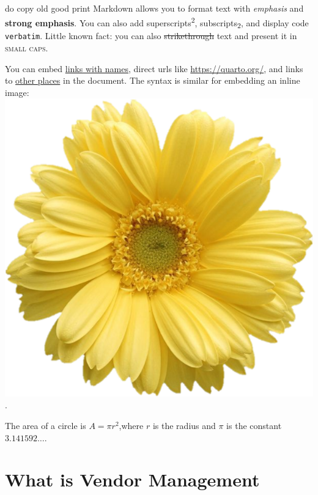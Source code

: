 \documentclass[
  10pt,
  ignorenonframetext,
  aspectratio=43,
]{beamer}
\begin{document}
\begin{frame}[fragile]{do copy old good print}
Markdown allows you to format text with \emph{emphasis} and
\textbf{strong emphasis}. You can also add
superscripts\textsuperscript{2}, subscripts\textsubscript{2}, and
display code \texttt{verbatim}. Little known fact: you can also
\sout{strikethrough} text and present it in \textsc{small caps}.

You can embed \href{https://quarto.org/}{links with names}, direct urls
like \url{https://quarto.org/}, and links to
\protect\hyperlink{inline-elements-text-formatting}{other places} in the
document. The syntax is similar for embedding an inline image:
\includegraphics{flowery.png}.

The area of a circle is \(A = \pi r^2\),where \(r\) is the radius and
\(\pi\) is the constant \(3.141592\ldots\).
\end{frame}

\hypertarget{what-is-vendor-management}{%
\section{What is Vendor Management}\label{what-is-vendor-management}}

\end{document}
